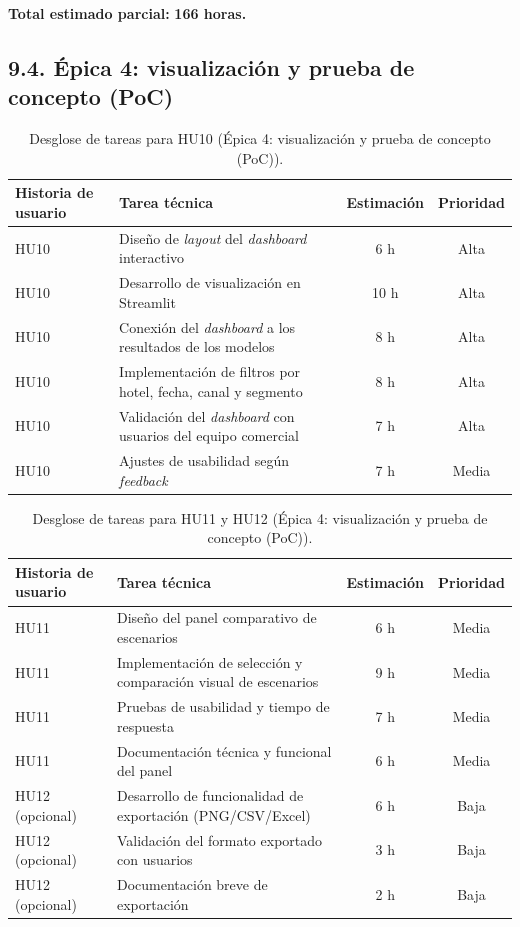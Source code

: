 \documentclass[
11pt, %
]{charter}
\begin{document}
\noindent
\textbf{Total estimado parcial:} \textbf{166 horas.}

\subsection*{9.4. Épica 4: visualización y prueba de concepto (PoC)}
 
\begin{table}[H]
\centering
\begin{tabularx}{\linewidth}{@{}|X|X|c|c|@{}}
\hline
\rowcolor[HTML]{C0C0C0}
Historia de usuario & Tarea técnica & Estimación & Prioridad \\ \hline
HU10 & Diseño de \textit{layout} del \textit{dashboard} interactivo & 6 h & Alta \\ \hline
HU10 & Desarrollo de visualización en Streamlit & 10 h & Alta \\ \hline
HU10 & Conexión del \textit{dashboard} a los resultados de los modelos & 8 h & Alta \\ \hline
HU10 & Implementación de filtros por hotel, fecha, canal y segmento & 8 h & Alta \\ \hline
HU10 & Validación del \textit{dashboard} con usuarios del equipo comercial & 7 h & Alta \\ \hline
HU10 & Ajustes de usabilidad según \textit{feedback} & 7 h & Media \\ \hline
\end{tabularx}
\caption{Desglose de tareas para HU10 (Épica 4: visualización y prueba de concepto (PoC)).}
\end{table}
 
\begin{table}[H]
\centering
\begin{tabularx}{\linewidth}{@{}|X|X|c|c|@{}}
\hline
\rowcolor[HTML]{C0C0C0}
Historia de usuario & Tarea técnica & Estimación & Prioridad \\ \hline
HU11 & Diseño del panel comparativo de escenarios & 6 h & Media \\ \hline
HU11 & Implementación de selección y comparación visual de escenarios & 9 h & Media \\ \hline
HU11 & Pruebas de usabilidad y tiempo de respuesta & 7 h & Media \\ \hline
HU11 & Documentación técnica y funcional del panel & 6 h & Media \\ \hline
HU12 (opcional) & Desarrollo de funcionalidad de exportación (PNG/CSV/Excel) & 6 h & Baja \\ \hline
HU12 (opcional) & Validación del formato exportado con usuarios & 3 h & Baja \\ \hline
HU12 (opcional) & Documentación breve de exportación & 2 h & Baja \\ \hline
\end{tabularx}
\caption{Desglose de tareas para HU11 y HU12 (Épica 4: visualización y prueba de concepto (PoC)).}
\end{table}
 
\end{document}
